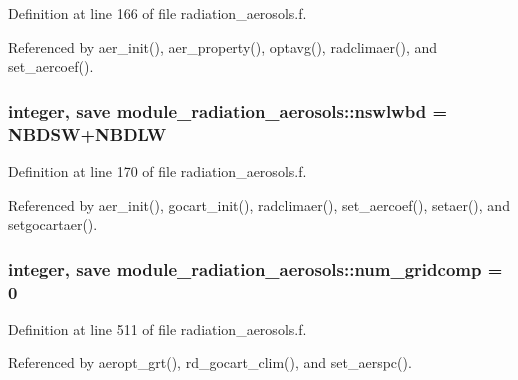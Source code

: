 Definition at line 166 of file radiation\+\_\+aerosols.\+f.



Referenced by aer\+\_\+init(), aer\+\_\+property(), optavg(), radclimaer(), and set\+\_\+aercoef().

\subsubsection[{\texorpdfstring{nswlwbd}{nswlwbd}}]{\setlength{\rightskip}{0pt plus 5cm}integer, save module\+\_\+radiation\+\_\+aerosols\+::nswlwbd = N\+B\+D\+SW+N\+B\+D\+LW\hspace{0.3cm}{\ttfamily [private]}}\hypertarget{group__module__radiation__aerosols_gab77b3b4aa76361277d828c7ba5dc3eda}{}\label{group__module__radiation__aerosols_gab77b3b4aa76361277d828c7ba5dc3eda}


Definition at line 170 of file radiation\+\_\+aerosols.\+f.



Referenced by aer\+\_\+init(), gocart\+\_\+init(), radclimaer(), set\+\_\+aercoef(), setaer(), and setgocartaer().

\subsubsection[{\texorpdfstring{num\+\_\+gridcomp}{num_gridcomp}}]{\setlength{\rightskip}{0pt plus 5cm}integer, save module\+\_\+radiation\+\_\+aerosols\+::num\+\_\+gridcomp = 0\hspace{0.3cm}{\ttfamily [private]}}\hypertarget{group__module__radiation__aerosols_ga6ddeb7b34ad2d6ab1575be3520e85891}{}\label{group__module__radiation__aerosols_ga6ddeb7b34ad2d6ab1575be3520e85891}


Definition at line 511 of file radiation\+\_\+aerosols.\+f.



Referenced by aeropt\+\_\+grt(), rd\+\_\+gocart\+\_\+clim(), and set\+\_\+aerspc().

